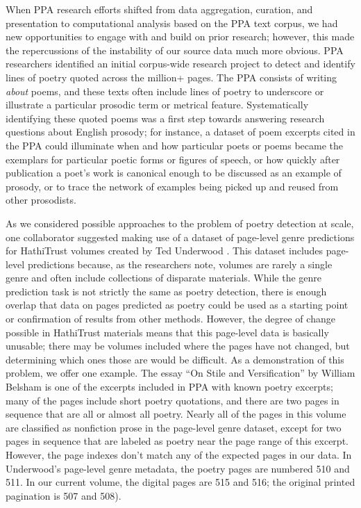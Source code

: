 \documentclass{anthology-ch}         %
\begin{document}
When PPA research efforts shifted from data aggregation, curation, and presentation to computational analysis based on the PPA text corpus, we had new opportunities to engage with and build on prior research; however, this made the repercussions of the instability of our source data much more obvious. PPA researchers identified an initial corpus-wide research project to detect and identify lines of poetry quoted across the million+ pages. The PPA consists of writing \textit{about }poems, and these texts often include lines of poetry to underscore or illustrate a particular prosodic term or metrical feature. Systematically identifying these quoted poems was a first step towards answering research questions about English prosody; for instance, a dataset of poem excerpts cited in the PPA could illuminate when and how particular poets or poems became the exemplars for particular poetic forms or figures of speech, or how quickly after publication a poet’s work is canonical enough to be discussed as an example of prosody, or to trace the network of examples being picked up and reused from other prosodists.

As we considered possible approaches to the problem of poetry detection at scale, one collaborator suggested making use of a dataset of page-level genre predictions for HathiTrust volumes created by Ted Underwood \cite{underwood_page-level_2014}. This dataset includes page-level predictions because, as the researchers note, volumes are rarely a single genre and often include collections of disparate materials. While the genre prediction task is not strictly the same as poetry detection, there is enough overlap that data on pages predicted as poetry could be used as a starting point or confirmation of results from other methods. However, the degree of change possible in HathiTrust materials means that this page-level data is basically unusable; there may be volumes included where the pages have not changed, but determining which ones those are would be difficult. As a demonstration of this problem, we offer one example. The essay “On Stile and Versification” by William Belsham\cite{belsham_stile_1799} is one of the excerpts included in PPA with known poetry excerpts; many of the pages include short poetry quotations, and there are two pages in sequence that are all or almost all poetry. Nearly all of the pages in this volume are classified as nonfiction prose in the page-level genre dataset, except for two pages in sequence that are labeled as poetry near the page range of this excerpt. However, the page indexes don’t match any of the expected pages in our data. In Underwood’s page-level genre metadata, the poetry pages are numbered 510 and 511. In our current volume, the digital pages are 515 and 516; the original printed pagination is 507 and 508).
\end{document}
